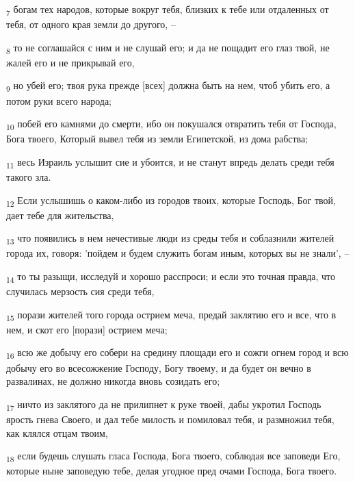 \begin{tcolorbox}
\textsubscript{7} богам тех народов, которые вокруг тебя, близких к тебе или отдаленных от тебя, от одного края земли до другого, --
\end{tcolorbox}
\begin{tcolorbox}
\textsubscript{8} то не соглашайся с ним и не слушай его; и да не пощадит его глаз твой, не жалей его и не прикрывай его,
\end{tcolorbox}
\begin{tcolorbox}
\textsubscript{9} но убей его; твоя рука прежде [всех] должна быть на нем, чтоб убить его, а потом руки всего народа;
\end{tcolorbox}
\begin{tcolorbox}
\textsubscript{10} побей его камнями до смерти, ибо он покушался отвратить тебя от Господа, Бога твоего, Который вывел тебя из земли Египетской, из дома рабства;
\end{tcolorbox}
\begin{tcolorbox}
\textsubscript{11} весь Израиль услышит сие и убоится, и не станут впредь делать среди тебя такого зла.
\end{tcolorbox}
\begin{tcolorbox}
\textsubscript{12} Если услышишь о каком-либо из городов твоих, которые Господь, Бог твой, дает тебе для жительства,
\end{tcolorbox}
\begin{tcolorbox}
\textsubscript{13} что появились в нем нечестивые люди из среды тебя и соблазнили жителей города их, говоря: 'пойдем и будем служить богам иным, которых вы не знали', --
\end{tcolorbox}
\begin{tcolorbox}
\textsubscript{14} то ты разыщи, исследуй и хорошо расспроси; и если это точная правда, что случилась мерзость сия среди тебя,
\end{tcolorbox}
\begin{tcolorbox}
\textsubscript{15} порази жителей того города острием меча, предай заклятию его и все, что в нем, и скот его [порази] острием меча;
\end{tcolorbox}
\begin{tcolorbox}
\textsubscript{16} всю же добычу его собери на средину площади его и сожги огнем город и всю добычу его во всесожжение Господу, Богу твоему, и да будет он вечно в развалинах, не должно никогда вновь созидать его;
\end{tcolorbox}
\begin{tcolorbox}
\textsubscript{17} ничто из заклятого да не прилипнет к руке твоей, дабы укротил Господь ярость гнева Своего, и дал тебе милость и помиловал тебя, и размножил тебя, как клялся отцам твоим,
\end{tcolorbox}
\begin{tcolorbox}
\textsubscript{18} если будешь слушать гласа Господа, Бога твоего, соблюдая все заповеди Его, которые ныне заповедую тебе, делая угодное пред очами Господа, Бога твоего.
\end{tcolorbox}
